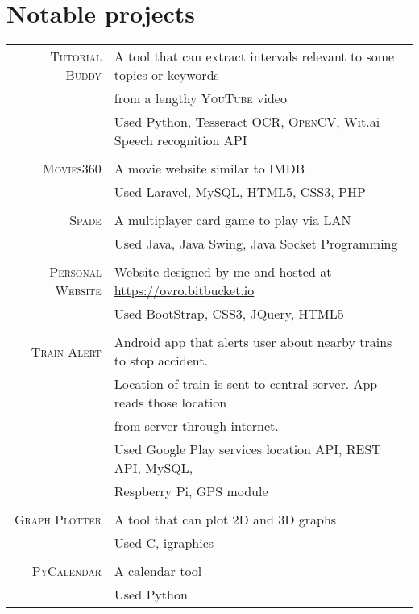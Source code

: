 \documentclass[a4paper,10pt]{article}
\begin{document}
\section{Notable projects}
\begin{longtable}{rl}

  \textsc{Tutorial Buddy} & A tool that can extract intervals relevant to some topics or keywords \\
  & from a lengthy \textsc{YouTube} video \\
  & Used Python, Tesseract \textsc{OCR}, \textsc{OpenCV}, Wit.ai Speech recognition API \\
  
  & \\
  
  \textsc{Movies360} & A movie website similar to \textsc{IMDB} \\
  & Used Laravel, My\textsc{SQL}, \textsc{HTML5}, \textsc{CSS3}, \textsc{PHP} \\

  & \\

  \textsc{Spade} & A multiplayer card game to play via \textsc{LAN} \\
  & Used Java, Java Swing, Java Socket Programming\\


  & \\

  \textsc{Personal Website} & Website designed by me and hosted at \href{https://ovro.bitbucket.io/}{https://ovro.bitbucket.io} \\
  & Used BootStrap, CSS3, JQuery, HTML5 \\

  & \\

  \textsc{Train Alert} & Android app that alerts user about nearby trains to stop accident. \\
  & Location of train is sent to central server. App reads those location \\
  & from server through internet. \\
  & Used Google Play services location API, \textsc{REST} API, My\textsc{SQL}, \\
  & Respberry Pi, GPS module \\
  
  & \\

  \textsc{Graph Plotter} & A tool that can plot \textsc{2D} and \textsc{3D} graphs \\
  & Used C, igraphics \\

  & \\

  \textsc{PyCalendar} & A calendar tool \\
  & Used Python

\end{longtable}
\end{document}
